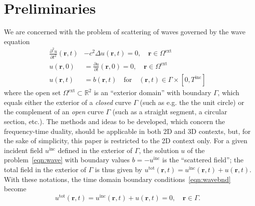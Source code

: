 \documentclass[11pt]{article}
\theoremstyle{plain}
\theoremstyle{remark}
\def \R{\mathbb{R}}
\def \br{\mathbf{r}}
\begin{document}
\section{Preliminaries}\label{sec:prelims}
We are concerned with the problem of scattering of waves governed by
the wave equation
\begin{subequations}\label{eqn:wave}
    \begin{align}
    \frac{\partial^2 u}{\partial t^2}(\br,t) &- c^2 \Delta u(\br,t) = 0, \quad \br \in \Omega^\mathrm{ext}\\
    u(\br,0) &= \frac{\partial u}{\partial t}(\br,0) = 0, \quad \br \in \Omega^\mathrm{ext}\\
    u(\br,t) &= b(\br,t) \quad \text{for} \quad (\br,t) \in \Gamma \times [0,T^{\mathrm{inc}}]\label{eqn:wavebnd}
\end{align}
\end{subequations}
where the open set $\Omega^\mathrm{ext}\subset \R^2$ is an ``exterior
domain'' with boundary $\Gamma$, which equals either the exterior of a
{\em closed} curve $\Gamma$ (such as e.g. the the unit circle) or the
complement of an {\em open} curve $\Gamma$ (such as a straight
segment, a circular section, etc.). The methods and ideas to be
developed, which concern the frequency-time duality, should be
applicable in both 2D and 3D contexts, but, for the sake of
simplicity, this paper is restricted to the 2D context only.  For a
given incident field $u^\mathrm{inc}$ defined in the exterior of
$\Gamma$, the solution $u$ of the problem~\eqref{eqn:wave} with
boundary values $b = -u^\mathrm{inc}$ is the ``scattered field''; the
total field in the exterior of $\Gamma$ is thus given by
$u^\mathrm{tot}(\br,t) = u^\mathrm{inc}(\br,t) + u(\br,t)$. With these
notations, the time domain boundary conditions~\eqref{eqn:wavebnd}
become
\begin{equation}\label{eqn:wave_bc}
    u^\mathrm{tot}(\br,t)  = u^\mathrm{inc}(\br,t) + u(\br,t) = 0, \quad \br \in \Gamma.
\end{equation}
\end{document}
